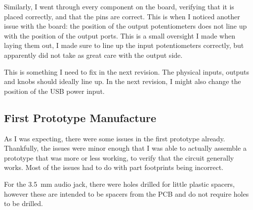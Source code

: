 \documentclass[a4paper]{article}
\begin{document}
Similarly, I went through every component on the board, verifying that it is placed correctly, and that the pins are correct. This is when I noticed another issue with the board: the position of the output potentiometers does not line up with the position of the output ports. This is a small oversight I made when laying them out, I made sure to line up the input potentiometers correctly, but apparently did not take as great care with the output side. 

\begin{center}
\small
{}
\end{center}

This is something I need to fix in the next revision. The physical inputs, outputs and knobs should ideally line up. In the next revision, I might also change the position of the USB power input.

\subsection{First Prototype Manufacture}

As I was expecting, there were some issues in the first prototype already. Thankfully, the issues were minor enough that I was able to actually assemble a prototype that was more or less working, to verify that the circuit generally works. Most of the issues had to do with part footprints being incorrect.

For the \SI{3.5}{\milli\meter} audio jack, there were holes drilled for little plastic spacers, however these are intended to be spacers from the PCB and do not require holes to be drilled.
\end{document}
